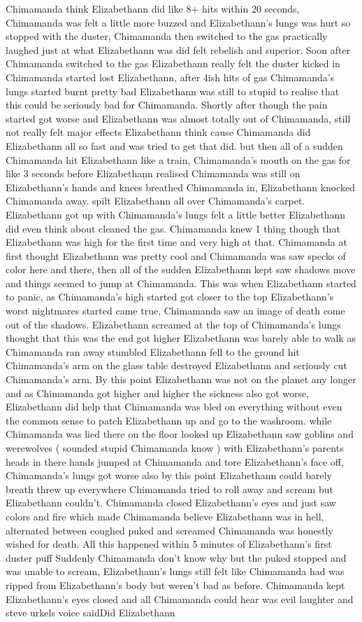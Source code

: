 \documentclass[12pt]{book}
\begin{document}
Chimamanda think Elizabethann did like 8+ hits within 20 seconds, Chimamanda was felt a little more buzzed and Elizabethann's lungs was hurt so stopped with the duster, Chimamanda then switched to the gas practically laughed just at what Elizabethann was did felt rebelish and superior. Soon after Chimamanda switched to the gas Elizabethann really felt the duster kicked in Chimamanda started lost Elizabethann, after 4ish hits of gas Chimamanda's lungs started burnt pretty bad Elizabethann was still to stupid to realise that this could be seriously bad for Chimamanda. Shortly after though the pain started got worse and Elizabethann was almost totally out of Chimamanda, still not really felt major effects Elizabethann think cause Chimamanda did Elizabethann all so fast and was tried to get that did. but then all of a sudden Chimamanda hit Elizabethann like a train, Chimamanda's mouth on the gas for like 3 seconds before Elizabethann realised Chimamanda was still on Elizabethann's hands and knees breathed Chimamanda in, Elizabethann knocked Chimamanda away. spilt Elizabethann all over Chimamanda's carpet. Elizabethann got up with Chimamanda's lungs felt a little better Elizabethann did even think about cleaned the gas. Chimamanda knew 1 thing though that Elizabethann was high for the first time and very high at that. Chimamanda at first thought Elizabethann was pretty cool and Chimamanda was saw specks of color here and there, then all of the sudden Elizabethann kept saw shadows move and things seemed to jump at Chimamanda. This was when Elizabethann started to panic, as Chimamanda's high started got closer to the top Elizabethann's worst nightmares started came true, Chimamanda saw an image of death come out of the shadows. Elizabethann screamed at the top of Chimamanda's lungs thought that this was the end got higher Elizabethann was barely able to walk as Chimamanda ran away stumbled Elizabethann fell to the ground hit Chimamanda's arm on the glass table destroyed Elizabethann and seriously cut Chimamanda's arm. By this point Elizabethann was not on the planet any longer and as Chimamanda got higher and higher the sickness also got worse, Elizabethann did help that Chimamanda was bled on everything without even the common sense to patch Elizabethann up and go to the washroom. while Chimamanda was lied there on the floor looked up Elizabethann saw goblins and werewolves ( sounded stupid Chimamanda know ) with Elizabethann's parents heads in there hands jumped at Chimamanda and tore Elizabethann's face off, Chimamanda's lungs got worse also by this point Elizabethann could barely breath threw up everywhere Chimamanda tried to roll away and scream but Elizabethann couldn't. Chimamanda closed Elizabethann's eyes and just saw colors and fire which made Chimamanda believe Elizabethann was in hell, alternated between coughed puked and screamed Chimamanda was honestly wished for death. All this happened within 5 minutes of Elizabethann's first duster puff Suddenly Chimamanda don't know why but the puked stopped and was unable to scream, Elizabethann's lungs still felt like Chimamanda had was ripped from Elizabethann's body but weren't bad as before. Chimamanda kept Elizabethann's eyes closed and all Chimamanda could hear was evil laughter and steve urkels voice saidDid Elizabethann 
\end{document}
